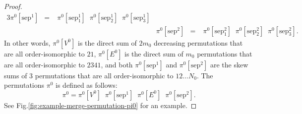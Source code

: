 \begin{proof}
\begin{alignat*}{3}
    \pi^0[\text{sep}^{1}] &=&\; \pi^0[\text{sep}^{1}_{1}] \;\; \pi^0[\text{sep}^{1}_{2}] \;\; \pi^0[\text{sep}^{1}_{3}] \\
    &&\quad&
    \pi^0[\text{sep}^{2}] &=&\; \pi^0[\text{sep}^{2}_{1}] \;\; \pi^0[\text{sep}^{2}_{2}] \;\; \pi^0[\text{sep}^{2}_{3}]\text{.}
  \end{alignat*}
  In other words,
  $\pi^0[V^0]$ is the direct sum of $2m_0$ decreasing permutations
  that are all order-isomorphic to $21$,
  $\pi^0[E^0]$ is the direct sum of $m_0$ permutations that are all
  order-isomorphic to $2341$, and
  both $\pi^0[\text{sep}^{1}]$ and $\pi^0[\text{sep}^{2}]$ are the skew sums
  of $3$ permutations that are all order-isomorphic to $12 \dots N_0$.
  The permutations $\pi^0$ is defined as follows:
  $$
  \pi^0 = \pi^0[V^0] \;\; \pi^0[\text{sep}^{1}] \;\; \pi^0[E^0] \;\; \pi^0[\text{sep}^{2}]\text{.}
  $$
  See Fig.\ref{fig:example-merge-permutation-pi0} for an example.

  


\end{proof}
